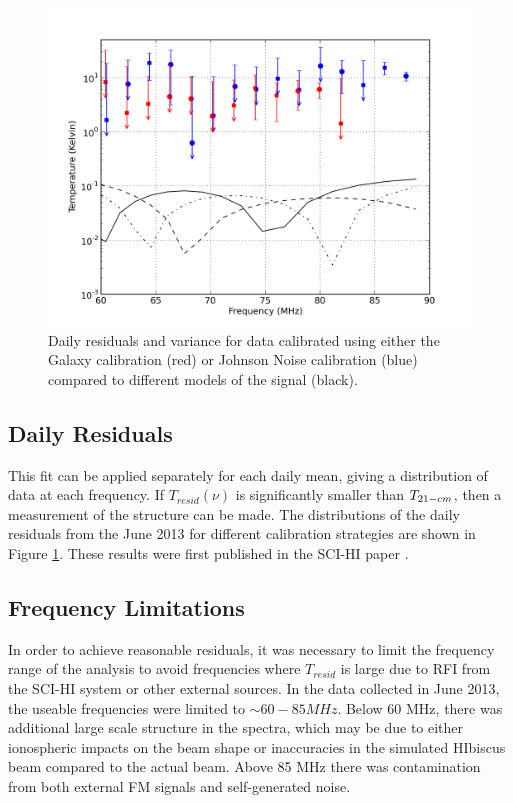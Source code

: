 \begin{figure}[htb]
\begin{center}
\includegraphics[width=0.95\linewidth]{Data_analysis/figures/joint_log_means.png}
\caption{Daily residuals and variance for data calibrated using either the Galaxy calibration (red) or Johnson Noise calibration (blue) compared to different models of the \cm signal (black). }
\label{Fig:resid}
\end{center}
\end{figure}

\subsection{Daily Residuals}
This fit can be applied separately for each daily mean, giving a distribution of data at each frequency. If $T_{resid}(\nu)$ is significantly smaller than $T_{21-cm}$, then a measurement of the \cm structure can be made. The distributions of the daily residuals from the June 2013 for different calibration strategies are shown in Figure \ref{Fig:resid}. These results were first published in the SCI-HI paper \cite{Voytek_2014}.  

\subsection{Frequency Limitations}
In order to achieve reasonable residuals, it was necessary to limit the frequency range of the analysis to avoid frequencies where $T_{resid}$ is large due to RFI from the SCI-HI system or other external sources. In the data collected in June 2013, the useable frequencies were limited to $\sim 60-85 MHz$. Below 60 MHz, there was additional large scale structure in the spectra, which may be due to either ionospheric impacts on the beam shape or inaccuracies in the simulated HIbiscus beam compared to the actual beam. Above 85 MHz there was contamination from both external FM signals and self-generated noise. 


